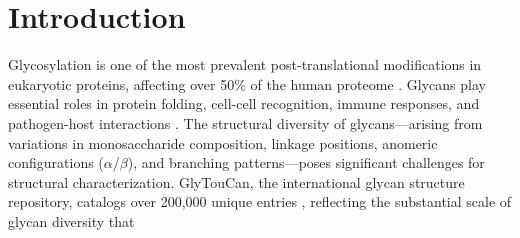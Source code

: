 \documentclass[11pt,a4paper]{article}
\begin{document}
\section{Introduction}

Glycosylation is one of the most prevalent post-translational modifications in eukaryotic proteins, affecting over 50\% of the human proteome \citep{varki2017}. Glycans play essential roles in protein folding, cell-cell recognition, immune responses, and pathogen-host interactions \citep{helenius2004}. The structural diversity of glycans---arising from variations in monosaccharide composition, linkage positions, anomeric configurations ($\alpha$/$\beta$), and branching patterns---poses significant challenges for structural characterization. GlyTouCan, the international glycan structure repository, catalogs over 200,000 unique entries \citep{tiemeyer2024}, reflecting the substantial scale of glycan diversity that
\end{document}
